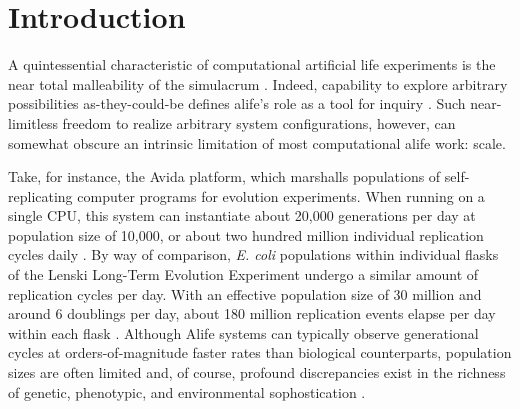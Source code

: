 \section{Introduction}

A quintessential characteristic of computational artificial life experiments is the near total malleability of the simulacrum \citep{pattee1989simulations}.
Indeed, capability to explore arbitrary possibilities as-they-could-be defines alife's role as a tool for inquiry \citep{langton1997artificial}.
Such near-limitless freedom to realize arbitrary system configurations, however, can somewhat obscure an intrinsic limitation of most computational alife work: scale.

Take, for instance, the Avida platform, which marshalls populations of self-replicating computer programs for evolution experiments.
When running on a single CPU, this system can instantiate about 20,000 generations per day at population size of 10,000, or about two hundred million individual replication cycles daily \citep{ofria2009artificial}.
By way of comparison, \textit{E. coli} populations within individual flasks of the Lenski Long-Term Evolution Experiment undergo a similar amount of replication cycles per day.
With an effective population size of 30 million and around 6 doublings per day, about 180 million replication events elapse per day within each flask \citep{good2017dynamics}.
Although Alife systems can typically observe generational cycles at orders-of-magnitude faster rates than biological counterparts, population sizes are often limited and, of course, profound discrepancies exist in the richness of genetic, phenotypic, and environmental sophostication \citep{PREPRINT}.

